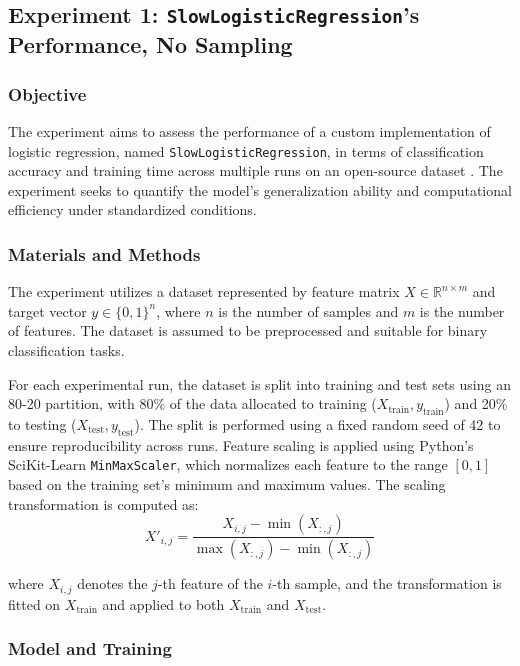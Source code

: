 \documentclass{article}
\theoremstyle{plain}
\theoremstyle{definition}
\theoremstyle{remark}
\begin{document}
\subsection{Experiment 1: \texttt{SlowLogisticRegression}'s Performance, No Sampling}


\subsubsection{Objective}

The experiment aims to assess the performance of a custom implementation of logistic regression, named \texttt{SlowLogisticRegression}, in terms of classification accuracy and training time across multiple runs on an open-source dataset \cite{breastcancer}. The experiment seeks to quantify the model's generalization ability and computational efficiency under standardized conditions.


\subsubsection{Materials and Methods}

The experiment utilizes a dataset represented by feature matrix $ X \in \mathbb{R}^{n \times m} $ and target vector $ y \in \{0, 1\}^n $, where $ n $ is the number of samples and $ m $ is the number of features. The dataset is assumed to be preprocessed and suitable for binary classification tasks.

For each experimental run, the dataset is split into training and test sets using an 80-20 partition, with 80\% of the data allocated to training ($ X_{\text{train}}, y_{\text{train}} $) and 20\% to testing ($ X_{\text{test}}, y_{\text{test}} $). The split is performed using a fixed random seed of 42 to ensure reproducibility across runs. Feature scaling is applied using Python's SciKit-Learn \texttt{MinMaxScaler}, which normalizes each feature to the range $[0, 1]$ based on the training set's minimum and maximum values. The scaling transformation is computed as:
$$
X'_{i,j} = \frac{X_{i,j} - \min(X_{:,j})}{\max(X_{:,j}) - \min(X_{:,j})}
$$

where $ X_{i,j} $ denotes the $ j $-th feature of the $ i $-th sample, and the transformation is fitted on $ X_{\text{train}} $ and applied to both $ X_{\text{train}} $ and $ X_{\text{test}} $.


\subsubsection{Model and Training}
\end{document}
